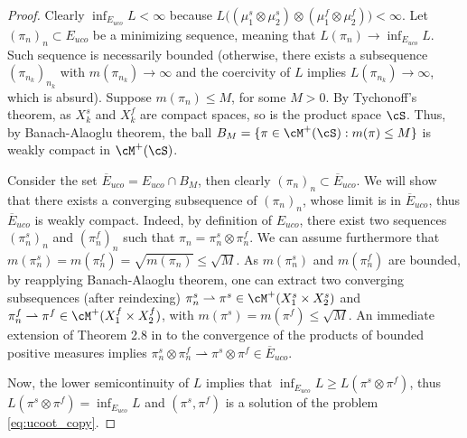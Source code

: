 \begin{proof}
  Clearly $\inf_{E_{uco}} L < \infty$ because
  $L\big( (\mu_1^s \otimes \mu_2^s) \otimes (\mu_1^f \otimes \mu_2^f) \big) < \infty$.
  Let $(\pi_n)_n \subset {E_{uco}}$ be a minimizing sequence, meaning that
  $L(\pi_n) \to \inf_{E_{uco}} L$.
  Such sequence is necessarily bounded (otherwise, there exists a subsequence $(\pi_{n_k})_{n_k}$
  with $m(\pi_{n_k}) \to \infty$ and the coercivity of $L$ implies $L(\pi_{n_k}) \to \infty$,
  which is absurd). Suppose $m(\pi_{n}) \leq M$, for some $M > 0$. By Tychonoff's theorem,
  as $X_k^s$ and $X_k^f$ are compact spaces,
  so is the product space $\cS$. Thus, by Banach-Alaoglu theorem,
  the ball $B_M = \{ \pi \in \cM^+(\cS): m(\pi) \leq M \}$
  is weakly compact in $\cM^+(\cS)$.

  Consider the set $\overline{E}_{uco} = E_{uco} \cap B_M$, then clearly
  $(\pi_n)_n \subset \overline{E}_{uco}$. We will show that
  there exists a converging subsequence of $(\pi_n)_n$, whose limit is in $\overline{E}_{uco}$,
  thus $\overline{E}_{uco}$ is weakly compact. Indeed, by definition of $E_{uco}$,
  there exist two sequences $(\pi_n^s)_n$ and $(\pi_n^f)_n$ such that
  $\pi_n = \pi_n^s \otimes \pi_n^f$.
  We can assume furthermore that $m(\pi_n^s) = m(\pi_n^f) = \sqrt{m(\pi_n)} \leq \sqrt M$.
  As $m(\pi_n^s)$ and $m(\pi_n^f)$ are bounded, by reapplying Banach-Alaoglu theorem,
  one can extract two converging subsequences (after reindexing)
  $\pi_n^s \rightharpoonup \pi^s \in \cM^+(X_1^s \times X_2^s)$ and
  $\pi_n^f \rightharpoonup \pi^f \in \cM^+(X_1^f \times X_2^f)$,
  with $m(\pi^s) = m(\pi^f) \leq \sqrt{M}$.
  An immediate extension of Theorem 2.8 in \citep{Billingsley99} to the convergence of
  the products of bounded positive measures implies
  $\pi_n^s \otimes \pi_n^f \rightharpoonup \pi^s \otimes \pi^f \in \overline{E}_{uco}$.

  Now, the lower semicontinuity of $L$ implies that $\inf_{E_{uco}} L \geq L(\pi^s \otimes \pi^f)$,
  thus $L(\pi^s \otimes \pi^f) = \inf_{E_{uco}} L$ and $(\pi^s, \pi^f)$
  is a solution of the problem \ref{eq:ucoot_copy}.
\end{proof}

